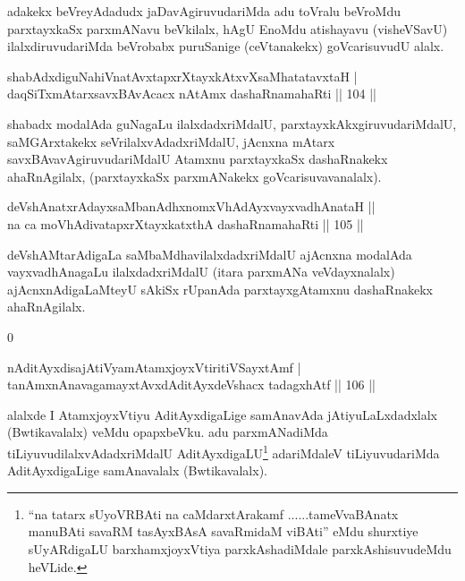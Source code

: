 \begin{artha}
adakekx beVreyAdadudx jaDavAgiruvudariMda adu toVralu beVroMdu parxtayxkaSx parxmANavu beVkilalx, hAgU EnoMdu atishayavu (visheVSavU) ilalxdiruvudariMda beVrobabx puruSanige (ceVtanakekx) goVcarisuvudU alalx.
\end{artha}

\begin{shl}
shabAdxdiguNahiVnatAvxtapxrXtayxkAtxvXsaMhatatavxtaH | \\
daqSiTxmAtarxsavxBAvAcacx nA\s \s tAmx dashaRnamahaRti \hfill||  104 ||  
\end{shl}

\begin{artha}
shabadx modalAda guNagaLu ilalxdadxriMdalU, parxtayxkAkxgiruvudariMdalU, saMGArxtakekx seVrilalxvAdadxriMdalU, jAcnxna mAtarx savxBAvavAgiruvudariMdalU Atamxnu parxtayxkaSx dashaRnakekx ahaRnAgilalx, (parxtayxkaSx parxmANakekx goVcarisuvavanalalx).
\end{artha}


\begin{shl}
deVshAnatxrAdayxsaMbanAdhxnomxVhAdAyxvayxvadhAnataH ||  \\
na ca moVhAdivatapxrXtayxkatxthA dashaRnamahaRti \hfill||  105 ||  
\end{shl}

\begin{artha}
deVshAMtarAdigaLa saMbaMdhavilalxdadxriMdalU ajAcnxna modalAda vayxvadhAnagaLu ilalxdadxriMdalU (itara parxmANa veVdayxnalalx) ajAcnxnAdigaLaMteyU sAkiSx rUpanAda parxtayxgAtamxnu dashaRnakekx ahaRnAgilalx.
\end{artha}0

\begin{shl}
nA\s \s ditAyxdisajAtiVyamAtamxjoyxVtiritiVSayxtAmf | \\
tanAmxnAnavagamayxtAvxdAditAyxdeVshacx tadagxhAtf \hfill||  106 ||  
\end{shl}

\begin{artha}
alalxde I AtamxjoyxVtiyu AditAyxdigaLige samAnavAda jAtiyuLaLxdadxlalx (Bwtikavalalx) veMdu opapxbeVku. adu parxmANadiMda tiLiyuvudilalxvAdadxriMdalU AditAyxdigaLU\footnote{``na tatarx sUyoVRBAti na caMdarxtArakamf ......tameVvaBAnatx manuBAti savaRM tasAyxBAsA savaRmidaM viBAti'' eMdu shurxtiye sUyARdigaLU barxhamxjoyxVtiya parxkAshadiMdale parxkAshisuvudeMdu heVLide.} adariMdaleV tiLiyuvudariMda AditAyxdigaLige samAnavalalx (Bwtikavalalx).
\end{artha}

